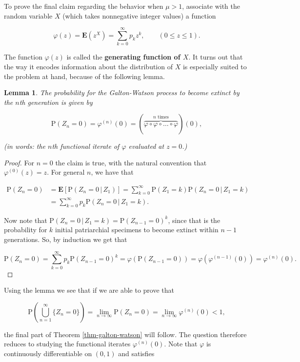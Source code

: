 \documentclass[11pt]{report}
\theoremstyle{plain}
\newtheorem{lem}[thm]{Lemma}
\theoremstyle{definition}
\begin{document}
To prove the final claim regarding the behavior when $\mu>1$, associate with the random variable $X$ (which takes nonnegative integer values) a function

\[
\varphi(z) = \mathbf{E}(z^X) = \sum_{k=0}^\infty p_k z^k, \qquad (0\le z\le 1).
\]

The function $\varphi(z)$ is called the \textbf{generating function of $X$}. It turns out that the way it encodes information about the distribution of $X$ is especially suited to the problem at hand, because of the following lemma.

\begin{lem}
The probability for the Galton-Watson process to become extinct by the $n$th generation is given by

\[
\mathrm{P}(Z_n = 0) = \varphi^{(n)}(0) = (\overbrace{\varphi\circ \varphi\circ \ldots \circ \varphi}^{\textrm{$n$ times}})(0),
\]

(in words: the $n$th functional iterate of $\varphi$ evaluated at $z=0$.)
\end{lem}

\begin{proof}
For $n=0$ the claim is true, with the natural convention that $\varphi^{(0)}(z)=z$. For general $n$, we have that

\begin{align*}
\mathrm{P}(Z_n = 0) &= \mathbf{E}\left[ \mathrm{P}\left( Z_n=0\,|\,Z_1 \right) \right] = \sum_{k=0}^\infty \mathrm{P}(Z_1=k) \mathrm{P}\left(Z_n=0\,|\,Z_1=k\right) \\
&= \sum_{k=0}^\infty p_k \mathrm{P}\left(Z_n=0\,|\,Z_1=k\right).
\end{align*}

Now note that $\mathrm{P}\left(Z_n=0\,|\,Z_1=k\right)=\mathrm{P}(Z_{n-1}=0)^k$, since that is the probability for $k$ initial patriarchial specimens to become extinct within $n-1$ generations. So, by induction we get that

\[
\mathrm{P}(Z_n=0) = \sum_{k=0}^\infty p_k \mathrm{P}(Z_{n-1}=0)^k = \varphi(\mathrm{P}(Z_{n-1}=0)) = \varphi(\varphi^{(n-1)}(0))
= \varphi^{(n)}(0).
\]

\end{proof}

Using the lemma we see that if we are able to prove that

\[
\mathrm{P}\left(\bigcup_{n=1}^\infty \{Z_n=0\}\right)= \lim_{n\to\infty} \mathrm{P}(Z_n=0) = \lim_{n\to\infty} \varphi^{(n)}(0)<1,
\]

the final part of Theorem \ref{thm-galton-watson} will follow. The question therefore reduces to studying the functional iterates $\varphi^{(n)}(0)$. Note that $\varphi$ is continuously differentiable on $(0,1)$ and satisfies
\end{document}
